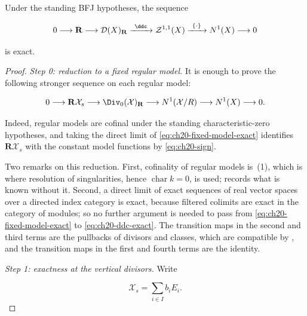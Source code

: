 \begin{theorem}\label{thm:ch20-ddc-exact}
Under the standing BFJ hypotheses, the sequence

\begin{equation}
\label{eq:ch20-ddc-exact}
 0\longrightarrow\mathbf R
 \longrightarrow\mathcal D(X)_{\mathbf R}
 \xrightarrow{\ \ddc\ }\mathcal Z^{1,1}(X)
 \xrightarrow{\ \{\cdot\}\ }N^1(X)
 \longrightarrow0
\end{equation}

is exact.
\end{theorem}

\begin{proof}
\emph{Step 0: reduction to a fixed regular model.}
It is enough to prove the following stronger sequence on each regular model:

\begin{equation}
\label{eq:ch20-fixed-model-exact}
 0\longrightarrow \mathbf R\mathcal X_s
 \longrightarrow \Div_0(\mathcal X)_{\mathbf R}
 \longrightarrow N^1(\mathcal X/R)
 \longrightarrow N^1(X)
 \longrightarrow0.
\end{equation}

Indeed, regular models are cofinal under the standing characteristic-zero
hypotheses, and taking the direct limit of
\eqref{eq:ch20-fixed-model-exact} identifies
\(\mathbf R\mathcal X_s\) with the constant model functions by
\eqref{eq:ch20-sign}.

Two remarks on this reduction.  First, cofinality of regular models is
\,(1), which is where resolution of singularities,
hence \(\operatorname{char}k=0\), is used;  records
what is known without it.  Second, a direct limit of exact sequences of
real vector spaces over a directed index category is exact, because
filtered colimits are exact in the category of modules; so no further
argument is needed to pass from \eqref{eq:ch20-fixed-model-exact} to
\eqref{eq:ch20-ddc-exact}.  The transition maps in the second and third
terms are the pullbacks of divisors and classes, which are compatible by
, and the transition maps in the first and
fourth terms are the identity.

\emph{Step 1: exactness at the vertical divisors.}
Write

\begin{equation}
\label{eq:ch20-special-fibre-components}
                       \mathcal X_s=\sum_{i\in I}b_iE_i.
\end{equation}


\end{proof}
